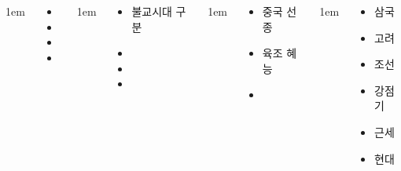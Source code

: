 \documentclass[20pt, a0paper, landscape]{tikzposter}
\begin{document}
\begin{columns}
			{
					\setlength{\leftmargini}{4em}
					\setlength{\labelsep} {1em}
				\begin{LARGE}
					\begin{itemize}
					\item 
					\item 
					\item 
					\item 
					\end{itemize}
				\end{LARGE}
			}




			{
					\setlength{\leftmargini}{3em}
					\setlength{\labelsep} {1em}
				\begin{LARGE}
					\begin{itemize}
					\item 불교시대 구분
					\item 
					\item 
					\item 
					\end{itemize}
				\end{LARGE}
			} %


			{
					\setlength{\leftmargini}{3em}
					\setlength{\labelsep} {1em}
				\begin{LARGE}
					\begin{itemize}
					\item 중국 선종
					\item 육조 혜능 
					\item 
					\end{itemize}
				\end{LARGE}
			} %


			{
					\setlength{\leftmargini}{3em}
					\setlength{\labelsep} {1em}
				\begin{LARGE}
					\begin{itemize}
					\item 삼국
					\item 고려
					\item 조선
					\item 강점기
					\item 근세
					\item 현대


\end{itemize}
\end{LARGE}}
\end{columns}
\end{document}
